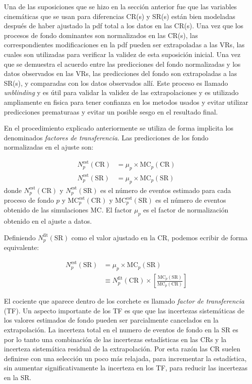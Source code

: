 Una de las suposiciones que se hizo en la sección anterior fue que las variables cinemáticas
que se usan para diferencias CR(s) y SR(s) están bien modeladas después de haber ajustado
la pdf total a los datos en las CR(s).
Una vez que los procesos de fondo dominantes son normalizados en las CR(s), las
correspondientes modificaciones en la pdf pueden ser extrapoladas a las VRs, las cuales
son utilizadas para verificar la validez de esta suposición inicial.
Una vez que se demuestra el acuerdo entre las predicciones del fondo normalizadas y los datos observados
en las VRs, las predicciones del fondo son extrapoladas a las SR(s), y comparadas con los
datos observados allí. Este proceso es llamado \emph{unblinding} y es útil para validar
la validez de las extrapolaciones y es utilizado ampliamente en fisica para tener confianza
en los metodos usados y evitar utilizar predicciones prematuraas y evitar un posible sesgo
en el resultado final.

En el procedimiento explicado anteriormente se utiliza de forma implicita los denominados
\emph{factores de transferencia}. Las predicciones de los fondo normalizadas en el ajuste son:

\begin{align}
  N_p^{\text{est}}(\text{CR}) &= \mu_p \times \text{MC}_p (\text{CR}) \\
  N_p^{\text{est}}(\text{SR}) &= \mu_p \times \text{MC}_p (\text{SR})
\end{align}
%
donde $N_p^{\text{est}}(\text{CR})$ y $N_p^{\text{est}}(\text{SR})$ es el número de eventos
estimado para cada proceso de fondo $p$ y $\text{MC}_p^{\text{est}}(\text{CR})$ y $\text{MC}_p^{\text{est}}(\text{SR})$
es el número de eventos obtenido de las simulaciones MC. El factor $\mu_p$
es el factor de normalización obtenido en el ajuste a datos.


Definiendo $N_p^\text{fit}(\text{SR})$ como el valor ajustado en la CR,
podemos ecribir de forma equivalente:

\begin{align}
  N_p^\text{est}(\text{SR}) &= \mu_p \times \text{MC}_p (\text{SR}) \nonumber \\
  &\equiv N_p^\text{fit}(\text{CR}) \times \left[ \frac{\text{MC}_p(\text{SR})}{\text{MC}_p(\text{CR})} \right]
\end{align}

El cociente que aparece dentro de los corchete es llamado \emph{factor de transferencia} (TF).
Un aspecto importante de los TF es que que las incertezas sistemáticas de los
valores estimados de fondo pueden ser parcialmente cancelados en la extrapolación.
La incerteza total en el numero de eventos de fondo en la SR es por lo tanto
una combinación de las incertezas estadísticas en las CRs y la incerteza sistemática
residual de la extrapolación. Por esta razón las CR suelen definirse con una selección
un poco más relajada, para incrementar la estadística, sin aumentar significativamente
la incerteza en los TF, para reducir las incertezas en la SR.

